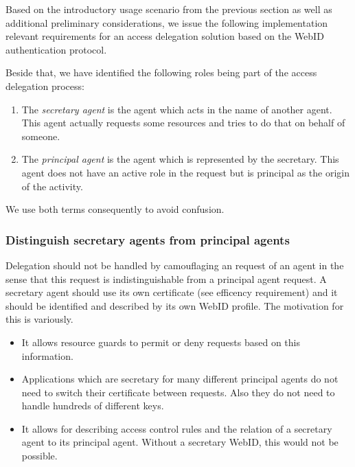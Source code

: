 \documentclass[a4paper]{llncs}
\begin{document}



Based on the introductory usage scenario from the previous section as well as additional preliminary considerations, we issue the following implementation relevant requirements for an access delegation solution based on the WebID authentication protocol.

Beside that, we have identified the following roles being part of the access delegation process:
\begin{enumerate}
    \item The \textit{secretary agent} is the agent which acts in the name of another agent.
This agent actually requests some resources and tries to do that on behalf of someone.
    \item The \textit{principal agent} is the agent which is represented by the secretary.
This agent does not have an active role in the request but is principal as the origin of the activity.
\end{enumerate}
We use both terms consequently to avoid confusion.

\subsubsection{Distinguish secretary agents from principal agents}
Delegation should not be handled by camouflaging an request of an agent in the sense that this request is indistinguishable from a principal agent request.
A secretary agent should use its own certificate (see efficency requirement) and it should be identified and described by its own WebID profile.
The motivation for this is variously.
\begin{itemize}
    \item It allows resource guards to permit or deny requests based on this information.
    \item Applications which are secretary for many different principal agents do not need to switch their certificate between requests.
Also they do not need to handle hundreds of different keys.
    \item It allows for describing access control rules and the relation of a secretary agent to its principal agent.
Without a secretary WebID, this would not be possible.
\end{itemize}
\end{document}
